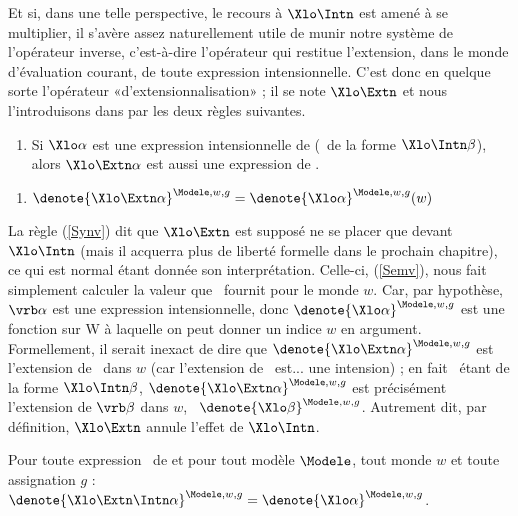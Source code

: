 Et si, dans une telle perspective, le recours à $\Xlo\Intn$ est amené à se multiplier, il s'avère assez naturellement utile de munir notre système de l'opérateur inverse, c'est-à-dire l'opérateur qui restitue l'extension, dans le monde
d'évaluation courant, de toute expression intensionnelle. C'est donc en quelque sorte l'opérateur {«d'extensionnalisation»} ; il se note {$\Xlo\Extn$} et nous l'introduisons dans {\LO} par les deux règles suivantes.


\begin{defi}
\begin{enumerate}[resume*=RglSyn1] %
  \item
Si $\Xlo\alpha$ est une expression intensionnelle de {\LO} (\ie\ de la forme $\Xlo\Intn\beta$),
alors $\Xlo\Extn\alpha$ est aussi une expression de \LO. \label{Synv}
\setcounter{RglSynt}{\value{enumi}}
\end{enumerate}
\begin{enumerate}[resume*=RglSem2] %
\item \(\denote{\Xlo\Extn\alpha}^{\Modele,w,g} = \denote{\Xlo\alpha}^{\Modele,w,g}(w) \) \label{Semv}
\setcounter{RglSem}{\value{enumi}}
\end{enumerate}
\end{defi}

La règle (\RSyn\ref{Synv}) dit que {$\Xlo\Extn$} est supposé ne se placer que devant $\Xlo\Intn$ (mais il acquerra plus de liberté formelle dans le prochain chapitre), ce qui est normal étant donnée son interprétation. Celle-ci, (\RSem\ref{Semv}), nous fait simplement calculer la valeur que \vrb\alpha\ fournit pour le monde $w$. Car, par hypothèse, $\vrb\alpha$ est une expression intensionnelle, donc $\denote{\Xlo\alpha}^{\Modele,w,g}$ est une fonction sur \Unv W à laquelle on peut donner un indice $w$ en argument. Formellement, il serait inexact de dire que $\denote{\Xlo\Extn\alpha}^{\Modele,w,g}$ est l'extension de \vrb\alpha\ dans $w$ (car l'extension de \vrb\alpha\ est... une intension) ; en fait \vrb\alpha\ étant de la forme $\Xlo\Intn\beta$, $\denote{\Xlo\Extn\alpha}^{\Modele,w,g}$ est précisément l'extension de $\vrb\beta$ dans $w$, \ie\ $\denote{\Xlo\beta}^{\Modele,w,g}$.  Autrement dit, par définition, $\Xlo\Extn$ annule l'effet de $\Xlo\Intn$.


\begin{theo}\label{theo:v^}
Pour toute expression \vrb\alpha\ de {\LO} et pour tout modèle $\Modele$, tout monde $w$ et toute assignation $g$ : \(\denote{\Xlo\Extn\Intn\alpha}^{\Modele,w,g}=\denote{\Xlo\alpha}^{\Modele,w,g}\).
\end{theo}

